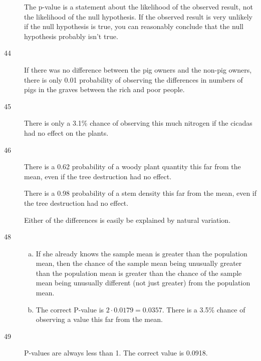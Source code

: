 \documentclass[letterpaper]{exam}
\begin{document}
\begin{description}
        The p-value is a statement about the likelihood of the observed result,
        not the likelihood of the null hypothesis. If the observed result is
        very unlikely if the null hypothesis is true, you can reasonably
        conclude that the null hypothesis probably isn't true.

      \item[44] If there was no difference between the pig owners and the
        non-pig owners, there is only 0.01 probability of observing the
        differences in numbers of pigs in the graves between the rich and poor
        people.

      \item[45] There is only a 3.1\% chance of observing this much nitrogen if
        the cicadas had no effect on the plants.

      \item[46] There is a 0.62 probability of a woody plant quantity this far
        from the mean, even if the tree destruction had no effect.

        There is a 0.98 probability of a stem density this far from the mean, even
        if the tree destruction had no effect.

        Either of the differences is easily be explained by natural variation.

      \item[48] 
        \begin{enumerate}[(a)]
          \item If she already knows the sample mean is greater than the
            population mean, then the chance of the sample mean being unusually
            greater than the population mean is greater than the chance of the
            sample mean being unusually different (not just greater) from the
            population mean.

          \item The correct P-value is $2 \cdot 0.0179 = 0.0357$. There is a
            3.5\% chance of observing a value this far from the mean.

        \end{enumerate}

      \item[49] P-values are always less than 1. The correct value is 0.0918.


\end{description}
\end{document}
